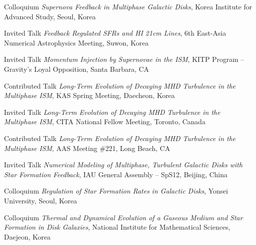\documentclass[12pt]{article}
\begin{document}
{Colloquium}
{\emph{Supernova Feedback in Multiphase Galactic Disks},
Korea Institute for Advanced Study,
Seoul, Korea}

{Invited Talk}
{\emph{Feedback Regulated SFRs and HI 21cm Lines},
6th East-Asia Numerical Astrophysics Meeting,
Suwon, Korea}

{Invited Talk}
{\emph{Momentum Injection by Supernovae in the ISM},
KITP Program -- Gravity's Loyal Opposition,
Santa Barbara, CA}

{Contributed Talk}
{\emph{Long-Term Evolution of Decaying MHD Turbulence in the Multiphase ISM},
KAS Spring Meeting,
Daecheon, Korea}

{Invited Talk}
{\emph{Long-Term Evolution of Decaying MHD Turbulence in the Multiphase ISM},
CITA National Fellow Meeting,
Toronto, Canada}

{Contributed Talk}
{\emph{Long-Term Evolution of Decaying MHD Turbulence in the Multiphase ISM},
AAS Meeting \#221,
Long Beach, CA}

{Invited Talk}
{\emph{Numerical Modeling of Multiphase, Turbulent Galactic Disks with Star Formation Feedback},
IAU General Assembly -- SpS12,
Beijing, China}

{Colloquium}
{\emph{Regulation of Star Formation Rates in Galactic Disks},
Yonsei University,
Seoul, Korea}

{Colloquium}
{\emph{Thermal and Dynamical Evolution of a Gaseous Medium and Star Formation in Disk Galaxies},
National Institute for Mathematical Sciences,
Daejeon, Korea}
\end{document}
